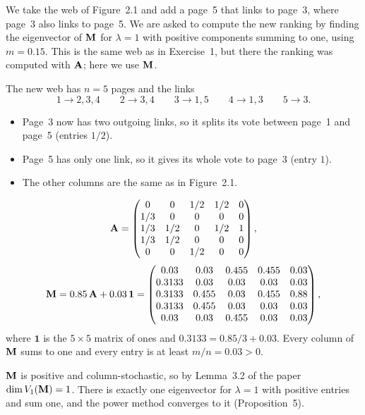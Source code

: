 

We take the web of Figure~2.1 and add a page~5 that links to page~3, where page~3 also links to page~5.
We are asked to compute the new ranking by finding the eigenvector of $\mathbf{M}$ for $\lambda = 1$ with positive components summing to one, using $m = 0.15$.
This is the same web as in Exercise~1, but there the ranking was computed with $\mathbf{A}$; here we use $\mathbf{M}$.


The new web has $n = 5$ pages and the links
\[
  1 \to 2,3,4 \qquad 2 \to 3,4 \qquad 3 \to 1,5 \qquad 4 \to 1,3 \qquad 5 \to 3 .
\]
\begin{itemize}
  \item Page~3 now has two outgoing links, so it splits its vote between page~1 and page~5 (entries $1/2$).
  \item Page~5 has only one link, so it gives its whole vote to page~3 (entry $1$).
  \item The other columns are the same as in Figure~2.1.
\end{itemize}
\[
  \mathbf{A} = \begin{pmatrix}
    0 & 0 & 1/2 & 1/2 & 0\\
    1/3 & 0 & 0 & 0 & 0\\
    1/3 & 1/2 & 0 & 1/2 & 1\\
    1/3 & 1/2 & 0 & 0 & 0\\
    0 & 0 & 1/2 & 0 & 0
  \end{pmatrix},
\]
\[
  \mathbf{M} = 0.85\,\mathbf{A} + 0.03\,\mathbf{1} =
  \begin{pmatrix}
    0.03 & 0.03 & 0.455 & 0.455 & 0.03\\
    0.3133 & 0.03 & 0.03 & 0.03 & 0.03\\
    0.3133 & 0.455 & 0.03 & 0.455 & 0.88\\
    0.3133 & 0.455 & 0.03 & 0.03 & 0.03\\
    0.03 & 0.03 & 0.455 & 0.03 & 0.03
  \end{pmatrix},
\]
where $\mathbf{1}$ is the $5\times5$ matrix of ones and $0.3133 = 0.85/3 + 0.03$.
Every column of $\mathbf{M}$ sums to one and every entry is at least $m/n = 0.03 > 0$.


$\mathbf{M}$ is positive and column-stochastic, so by Lemma~3.2 of the paper $\dim V_1(\mathbf{M}) = 1$.
There is exactly one eigenvector for $\lambda = 1$ with positive entries and sum one, and the power method converges to it (Proposition~5).

